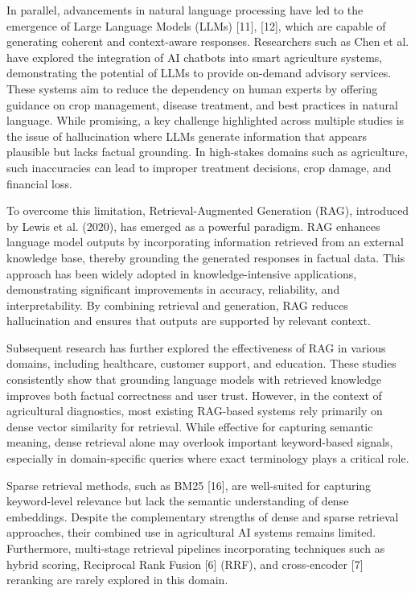 In parallel, advancements in natural language processing have led to the
emergence of Large Language Models (LLMs) {[}11{]}, {[}12{]}, which are
capable of generating coherent and context-aware responses. Researchers
such as Chen et al. have explored the integration of AI chatbots into
smart agriculture systems, demonstrating the potential of LLMs to
provide on-demand advisory services. These systems aim to reduce the
dependency on human experts by offering guidance on crop management,
disease treatment, and best practices in natural language. While
promising, a key challenge highlighted across multiple studies is the
issue of hallucination where LLMs generate information that appears
plausible but lacks factual grounding. In high-stakes domains such as
agriculture, such inaccuracies can lead to improper treatment decisions,
crop damage, and financial loss.

To overcome this limitation, Retrieval-Augmented Generation (RAG),
introduced by Lewis et al. (2020), has emerged as a powerful paradigm.
RAG enhances language model outputs by incorporating information
retrieved from an external knowledge base, thereby grounding the
generated responses in factual data. This approach has been widely
adopted in knowledge-intensive applications, demonstrating significant
improvements in accuracy, reliability, and interpretability. By
combining retrieval and generation, RAG reduces hallucination and
ensures that outputs are supported by relevant context.

Subsequent research has further explored the effectiveness of RAG in
various domains, including healthcare, customer support, and education.
These studies consistently show that grounding language models with
retrieved knowledge improves both factual correctness and user trust.
However, in the context of agricultural diagnostics, most existing
RAG-based systems rely primarily on dense vector similarity for
retrieval. While effective for capturing semantic meaning, dense
retrieval alone may overlook important keyword-based signals, especially
in domain-specific queries where exact terminology plays a critical
role.

Sparse retrieval methods, such as BM25 {[}16{]}, are well-suited for
capturing keyword-level relevance but lack the semantic understanding of
dense embeddings. Despite the complementary strengths of dense and
sparse retrieval approaches, their combined use in agricultural AI
systems remains limited. Furthermore, multi-stage retrieval pipelines
incorporating techniques such as hybrid scoring, Reciprocal Rank Fusion
{[}6{]} (RRF), and cross-encoder {[}7{]} reranking are rarely explored
in this domain.

